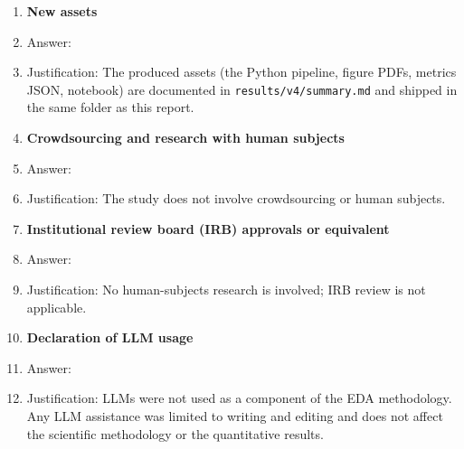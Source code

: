 \documentclass{article}
\begin{document}
\begin{enumerate}
\item {\bf New assets}
    \item[] Answer: \answerYes{}
    \item[] Justification: The produced assets (the Python pipeline, figure PDFs, metrics JSON, notebook) are documented in \texttt{results/v4/summary.md} and shipped in the same folder as this report.

\item {\bf Crowdsourcing and research with human subjects}
    \item[] Answer: \answerNA{}
    \item[] Justification: The study does not involve crowdsourcing or human subjects.

\item {\bf Institutional review board (IRB) approvals or equivalent}
    \item[] Answer: \answerNA{}
    \item[] Justification: No human-subjects research is involved; IRB review is not applicable.

\item {\bf Declaration of LLM usage}
    \item[] Answer: \answerNA{}
    \item[] Justification: LLMs were not used as a component of the EDA methodology. Any LLM assistance was limited to writing and editing and does not affect the scientific methodology or the quantitative results.

\end{enumerate}
\end{document}
